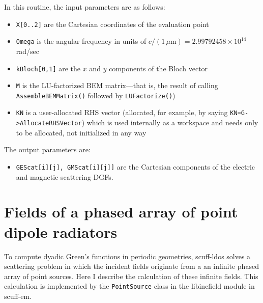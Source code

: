 \documentclass[letterpaper]{article}
\begin{document}
In this routine, the input parameters are as follows:

\begin{itemize}
 \item \texttt{X[0..2]} are the Cartesian coordinates of the evaluation point
 \item \texttt{Omega} is the angular frequency in units of $c/(1\,\mu\text{m})=2.99792458\times 10^{14}$ rad/sec
 \item \texttt{kBloch[0,1]} are the $x$ and $y$ components of the Bloch vector
 \item \texttt{M} is the LU-factorized BEM matrix---that is, the result of 
       calling \texttt{AssembleBEMMatrix()} followed by \texttt{LUFactorize()})
 \item \texttt{KN} is a user-allocated RHS vector (allocated, for example,
       by saying \texttt{KN=G->AllocateRHSVector}) which is used internally
       as a workspace and needs only to be allocated, not initialized in any way
\end{itemize}

The output parameters are:

\begin{itemize}
 \item \texttt{GEScat[i][j], GMScat[i][j]]} are the Cartesian components of the 
       electric and magnetic scattering DGFs.
\end{itemize}

\appendix
\newpage 
\section{Fields of a phased array of point dipole radiators}
\label{DipoleFieldsAppendix}

To compute dyadic Green's functions in periodic geometries,
{\sc scuff-ldos} solves a scattering problem in which the
incident fields originate from a an infinite phased array
of point sources. Here I describe the calculation of these
infinite fields. This calculation is implemented by the 
\texttt{PointSource} 
class in the {\sc libincfield} module in {\sc scuff-em}.
\end{document}
